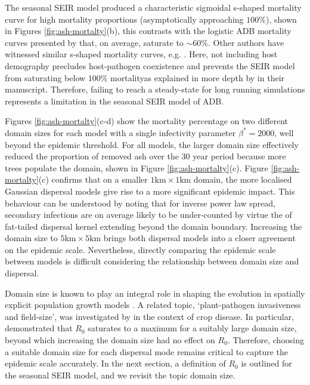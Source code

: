 The seasonal SEIR model produced a characteristic sigmoidal s-shaped mortality curve for high mortality proportions 
(asymptotically approaching $100\%$), shown in Figures \ref{fig:ash-mortalty}(b), this contrasts with the logistic ADB mortality 
curves presented by \cite{https://doi.org/10.1002/ppp3.11} that, on average, saturate to $\sim 60 \%$.
Other authors have witnessed similar s-shaped mortality curves, e.g. \cite{lohmus2014ash}.
Here, not including host demography precludes host-pathogen coexistence and prevents the SEIR model from saturating below
$100\%$ mortality\textemdash as explained in more depth by \cite{time-varying-infectivity} in their manuscript.
Therefore, failing to reach a steady-state for long running simulations represents a limitation in the seasonal SEIR model of ADB.

Figures \ref{fig:ash-mortalty}(c-d) show the mortality percentage on two different domain sizes for each model with a single infectivity parameter $\beta^*=2000$, well beyond the epidemic threshold.
For all models, the larger domain size effectively reduced the proportion of removed ash over the $30$ year period because more trees populate the domain, shown in Figure \ref{fig:ash-mortalty}(c).
Figure \ref{fig:ash-mortalty}(c) confirms that on a smaller $1\mathrm{km}\times 1\mathrm{km}$ domain, the more localised Gaussian dispersal models give rise to a more significant epidemic impact.
This behaviour can be understood by noting that for inverse power law spread, secondary infections are on average likely to be under-counted
by virtue the of fat-tailed dispersal kernel extending beyond the domain boundary.
Increasing the domain size to $5\mathrm{km}\times 5\mathrm{km}$ brings both dispersal models into a closer agreement on the epidemic scale.
Nevertheless, directly comparing the epidemic scale between models is difficult considering the relationship between domain size and dispersal.

Domain size is known to play an integral role in shaping the evolution in spatially explicit population growth models \cite{tang2011asymptotic}.
A related topic, `plant-pathogen invasiveness and field-size', was investigated by \cite{mikaberidze2016invasiveness} in the context of crop disease.
In particular, \cite{mikaberidze2016invasiveness} demonstrated that $R_0$ saturates to a maximum for a suitably large domain size, beyond which increasing the domain size had no effect on $R_0$.
Therefore, choosing a suitable domain size for each dispersal mode remains critical to capture the epidemic scale accurately.
In the next section, a definition of $R_0$ is outlined for the seasonal SEIR model, and we revisit the topic domain size.

